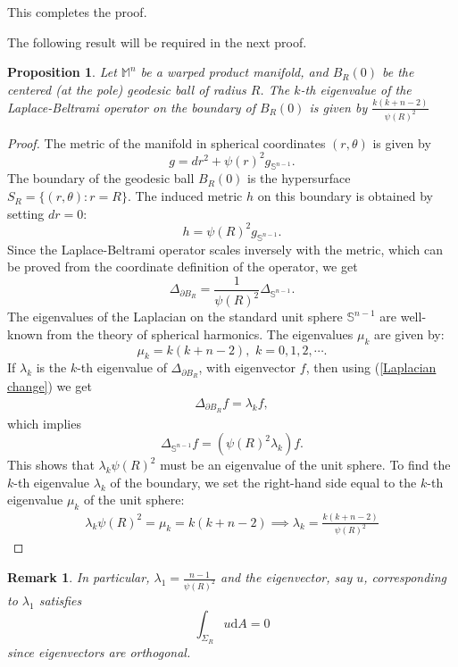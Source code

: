 \documentclass[a4paper,11pt,reqno]{amsart}
\renewcommand\eqref[1]{(\ref{#1})}
\theoremstyle{plain}
\newtheorem{proposition}{Proposition}[section]
\newtheorem{remark}{Remark}[section]
\numberwithin{equation}{section} \allowdisplaybreaks
\newcommand{\m}{\mathbb{M}^n}
\newcommand{\sn}{\mathbb{S}^{n-1}}
\begin{document}
This completes the proof.

\medskip
 
The following result will be required in the next proof.
\begin{proposition}
    Let $\m$ be a warped product manifold, and $B_R(0)$ be the centered (at the pole) geodesic ball of radius $R$. The $k$-th eigenvalue of the Laplace-Beltrami operator on the boundary of $B_R(0)$ is given by  $\frac{k(k+n-2)}{\psi(R)^2}$
\end{proposition}
\begin{proof}
    The metric of the manifold in spherical coordinates $(r,\theta)$ is given by
    \begin{equation*}
        g=dr^2+\psi(r)^2g_{\sn}.
    \end{equation*}
The boundary of the geodesic ball $B_R(0)$ is the hypersurface $S_R=\{(r,\theta): r=R\}$. The induced metric $h$ on this boundary is obtained by setting $dr=0:$
\begin{equation*}
    h=\psi(R)^2g_{\sn}.
\end{equation*}
    Since the Laplace-Beltrami operator scales inversely with the metric, which can be proved from the coordinate definition of the operator, we get
    \begin{equation}\label{Laplacian change}
        \Delta_{\partial B_R}=\frac{1}{\psi(R)^2}\Delta_{\sn}.
    \end{equation}
    The eigenvalues of the Laplacian on the standard unit sphere $\sn$ are well-known from the theory of spherical harmonics. The eigenvalues $\mu_k$ are given by:
    \begin{equation*}
        \mu_k=k(k+n-2),\,\,k=0,1,2,\cdots.
    \end{equation*}
    If $\lambda_k$ is the $k$-th eigenvalue of $\Delta_{\partial B_R}$, with eigenvector $f$, then using \eqref{Laplacian change} we get
    \begin{align*}
        \Delta_{\partial B_R}f=\lambda_k f,
    \end{align*}
    which implies
    \begin{equation*}
        \Delta_{\sn}f=(\psi(R)^2\lambda_k)f.
    \end{equation*}
This shows that $\lambda_k \psi(R)^2$ must be an eigenvalue of the unit sphere. To find the $k$-th eigenvalue $\lambda_k$ of the boundary, we set the right-hand side equal to the $k$-th eigenvalue $\mu_k$ of the unit sphere:
\begin{align*}
    \lambda_k \psi(R)^2=\mu_k=k(k+n-2)
    \implies\lambda_k=\frac{k(k+n-2)}{\psi(R)^2}
\end{align*}
\end{proof}
\begin{remark}
\rm
    In particular, $\lambda_1=\frac{n-1}{\psi(R)^2}$ and the eigenvector, say $u$, corresponding to $\lambda_1$ satisfies
    \begin{equation*}
        \int_{\Sigma_R}u \mathrm{d}A=0
    \end{equation*}
    since eigenvectors are orthogonal. 
    \rm
\end{remark}
\end{document}

